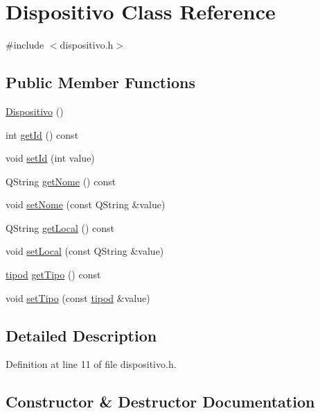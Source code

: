 \hypertarget{class_dispositivo}{}\section{Dispositivo Class Reference}
\label{class_dispositivo}


{\ttfamily \#include $<$dispositivo.\+h$>$}

\subsection*{Public Member Functions}
\begin{DoxyCompactItemize}
\item 
\hyperlink{class_dispositivo_a08b3611c10447a1519d7ebb72f47e30d}{Dispositivo} ()
\item 
int \hyperlink{class_dispositivo_a4d470c1481fd167db94e6be4f08a259c}{get\+Id} () const
\item 
void \hyperlink{class_dispositivo_a186a8fdf627e6e9326a196fa7ad59846}{set\+Id} (int value)
\item 
Q\+String \hyperlink{class_dispositivo_a463552b0487176c52c477d7951287b4b}{get\+Nome} () const
\item 
void \hyperlink{class_dispositivo_a8bafe761c02216dd6bc7465eb4ff0064}{set\+Nome} (const Q\+String \&value)
\item 
Q\+String \hyperlink{class_dispositivo_a29327cf38f2c0b021e1197f12d02bf9c}{get\+Local} () const
\item 
void \hyperlink{class_dispositivo_a033c98bd8e7be483677b06ead506fe9d}{set\+Local} (const Q\+String \&value)
\item 
\hyperlink{classtipod}{tipod} \hyperlink{class_dispositivo_a0242efd1a66cffb9e979432e941d68ca}{get\+Tipo} () const
\item 
void \hyperlink{class_dispositivo_ada239ce7b043c5ae4d426cf4f1d0cf8f}{set\+Tipo} (const \hyperlink{classtipod}{tipod} \&value)
\end{DoxyCompactItemize}


\subsection{Detailed Description}


Definition at line 11 of file dispositivo.\+h.



\subsection{Constructor \& Destructor Documentation}
\hypertarget{class_dispositivo_a08b3611c10447a1519d7ebb72f47e30d}{}\label{class_dispositivo_a08b3611c10447a1519d7ebb72f47e30d} 
